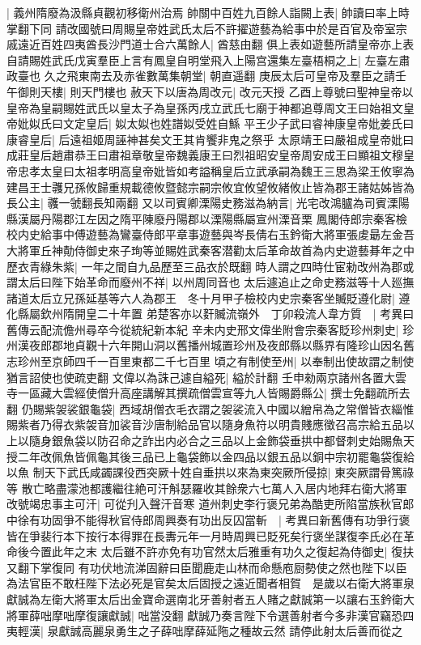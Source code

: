 |{
	義州隋廢為汲縣貞觀初移衛州治焉}
帥關中百姓九百餘人詣闕上表|{
	帥讀曰率上時掌翻下同}
請改國號曰周賜皇帝姓武氏太后不許擢遊藝為給事中於是百官及帝室宗戚遠近百姓四夷酋長沙門道士合六萬餘人|{
	酋慈由翻}
俱上表如遊藝所請皇帝亦上表自請賜姓武氏戊寅羣臣上言有鳳皇自明堂飛入上陽宫還集左臺梧桐之上|{
	左臺左肅政臺也}
久之飛東南去及赤雀數萬集朝堂|{
	朝直遥翻}
庚辰太后可皇帝及羣臣之請壬午御則天樓|{
	則天門樓也}
赦天下以唐為周改元|{
	改元天授}
乙酉上尊號曰聖神皇帝以皇帝為皇嗣賜姓武氏以皇太子為皇孫丙戌立武氏七廟于神都追尊周文王曰始祖文皇帝妣姒氏曰文定皇后|{
	姒太姒也姓譜姒受姓自鯀}
平王少子武曰睿神康皇帝妣姜氏曰康睿皇后|{
	后遠祖姬周誣神甚矣文王其肯饗非鬼之祭乎}
太原靖王曰嚴祖成皇帝妣曰成莊皇后趙肅恭王曰肅祖章敬皇帝魏義康王曰烈祖昭安皇帝周安成王曰顯祖文穆皇帝忠孝太皇曰太祖孝明高皇帝妣皆如考謚稱皇后立武承嗣為魏王三思為梁王攸寧為建昌王士彠兄孫攸歸重規載德攸暨懿宗嗣宗攸宜攸望攸緒攸止皆為郡王諸姑姊皆為長公主|{
	彠一虢翻長知兩翻}
又以司賓卿溧陽史務滋為納言|{
	光宅改鴻臚為司賓溧陽縣漢屬丹陽郡江左因之隋平陳廢丹陽郡以溧陽縣屬宣州溧音栗}
鳳閣侍郎宗秦客檢校内史給事中傅遊藝為鸞臺侍郎平章事遊藝與岑長倩右玉鈐衛大將軍張䖍朂左金吾大將軍丘神勣侍御史來子珣等並賜姓武秦客潜勸太后革命故首為内史遊藝朞年之中歷衣青綠朱紫|{
	一年之間自九品歷至三品衣於既翻}
時人謂之四時仕宦勑改州為郡或謂太后曰陛下始革命而廢州不祥|{
	以州周同音也}
太后遽追止之命史務滋等十人廵撫諸道太后立兄孫延基等六人為郡王　冬十月甲子檢校内史宗秦客坐贓貶遵化尉|{
	遵化縣屬欽州隋開皇二十年置}
弟楚客亦以姧贓流嶺外　丁卯殺流人韋方質　|{
	考異曰舊傳云配流儋州尋卒今從統紀新本紀}
辛未内史邢文偉坐附會宗秦客貶珍州刺史|{
	珍州漢夜郎郡地貞觀十六年開山洞以舊播州城置珍州及夜郎縣以縣界有隆珍山因名舊志珍州至京師四千一百里東都二千七百里}
頃之有制使至州|{
	以奉制出使故謂之制使猶言詔使也使疏吏翻}
文偉以為誅己遽自縊死|{
	縊於計翻}
壬申勑兩京諸州各置大雲寺一區藏大雲經使僧升高座講解其撰疏僧雲宣等九人皆賜爵縣公|{
	撰士免翻疏所去翻}
仍賜紫袈裟銀龜袋|{
	西域胡僧衣毛衣謂之袈裟流入中國以繒帛為之常僧皆衣緇惟賜紫者乃得衣紫袈音加裟音沙唐制給品官以隨身魚符以明貴賤應徵召高宗給五品以上以隨身銀魚袋以防召命之詐出内必合之三品以上金飾袋垂拱中都督刺史始賜魚天授二年改佩魚皆佩龜其後三品已上龜袋飾以金四品以銀五品以銅中宗初罷龜袋復給以魚}
制天下武氏咸蠲課役西突厥十姓自垂拱以來為東突厥所侵掠|{
	東突厥謂骨篤祿等}
散亡略盡濛池都護繼往絶可汗斛瑟羅收其餘衆六七萬人入居内地拜右衛大將軍改號竭忠事主可汗|{
	可從刋入聲汗音寒}
道州刺史李行褒兄弟為酷吏所陷當族秋官郎中徐有功固爭不能得秋官侍郎周興奏有功出反囚當斬　|{
	考異曰新舊傳有功爭行褒皆在爭裴行本下按行本得罪在長夀元年一月時周興已貶死矣行褒坐謀復李氏必在革命後今置此年之末}
太后雖不許亦免有功官然太后雅重有功久之復起為侍御史|{
	復扶又翻下掌復同}
有功伏地流涕固辭曰臣聞鹿走山林而命懸庖厨勢使之然也陛下以臣為法官臣不敢枉陛下法必死是官矣太后固授之遠近聞者相賀　是歲以右衛大將軍泉獻誠為左衛大將軍太后出金寶命選南北牙善射者五人賭之獻誠第一以讓右玉鈐衛大將軍薛咄摩咄摩復讓獻誠|{
	咄當没翻}
獻誠乃奏言陛下令選善射者今多非漢官竊恐四夷輕漢|{
	泉獻誠高麗泉勇生之子薛咄摩薛延陁之種故云然}
請停此射太后善而從之

